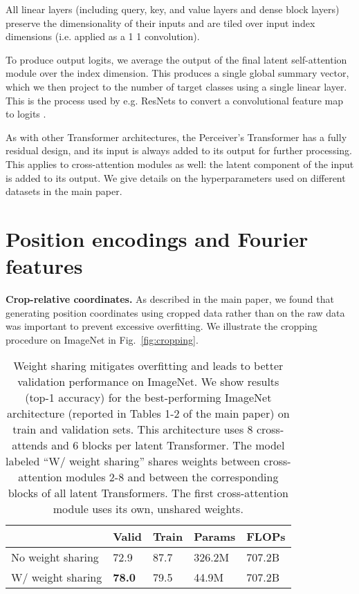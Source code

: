 \documentclass{article}
\begin{document}
All linear layers (including query, key, and value layers and dense block layers) preserve the dimensionality of their inputs and are tiled over input index dimensions (i.e. applied as a 1  1 convolution).

To produce output logits, we average the output of the final latent self-attention module over the index dimension. This produces a single global summary vector, which we then project to the number of target classes using a single linear layer. This is the process used by e.g. ResNets to convert a convolutional feature map to logits \cite{he2016deep}.

As with other Transformer architectures, the Perceiver's Transformer has a fully residual design, and its input is always added to its output for further processing. This applies to cross-attention modules as well: the latent component of the input is added to its output. We give details on the hyperparameters used on different datasets in the main paper.


\section{Position encodings and Fourier features}

\noindent \textbf{Crop-relative coordinates.} As described in the main paper, we found that generating position coordinates using cropped data rather than on the raw data was important to prevent excessive overfitting. We illustrate the cropping procedure on ImageNet in Fig.~\ref{fig:cropping}.

\begin{table}[]
\begin{tabular}{|l|l|l|l|l|}
                                                                      \hline
                  & Valid         & Train       & Params & FLOPs   \\ \hline
No weight sharing & 72.9          & 87.7        & 326.2M & 707.2B  \\ \hline
W/ weight sharing & \textbf{78.0} & 79.5        & 44.9M  & 707.2B  \\ \hline
\end{tabular}
\caption{Weight sharing mitigates overfitting and leads to better validation performance on ImageNet. We show results (top-1 accuracy) for the best-performing ImageNet architecture (reported in Tables 1-2 of the main paper) on train and validation sets. This architecture uses 8 cross-attends and 6 blocks per latent Transformer. The model labeled ``W/ weight sharing'' shares weights between cross-attention modules 2-8 and between the corresponding blocks of all latent Transformers. The first cross-attention module uses its own, unshared weights.}
\label{tab:weight_sharing}
\vspace{-12pt}
\end{table}
\end{document}
